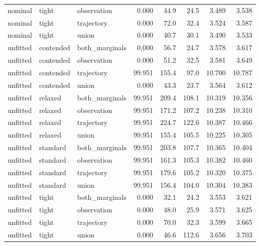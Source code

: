 \begin{longtable}{@{}lllrrrrr@{}}
nominal & tight & observation & 0.000 & 44.9 & 24.5 & 3.489 & 3.538\\
nominal & tight & trajectory & 0.000 & 72.0 & 32.4 & 3.524 & 3.587\\
nominal & tight & union & 0.000 & 40.7 & 30.1 & 3.490 & 3.533\\
unfitted & contended & both\_marginals & 0.000 & 56.7 & 24.7 & 3.578 & 3.617\\
unfitted & contended & observation & 0.000 & 51.2 & 32.5 & 3.581 & 3.649\\
unfitted & contended & trajectory & 99.951 & 155.4 & 97.0 & 10.700 & 10.787\\
unfitted & contended & union & 0.000 & 43.3 & 23.7 & 3.564 & 3.612\\
unfitted & relaxed & both\_marginals & 99.951 & 209.4 & 108.1 & 10.319 & 10.356\\
unfitted & relaxed & observation & 99.951 & 171.2 & 107.2 & 10.238 & 10.310\\
unfitted & relaxed & trajectory & 99.951 & 224.7 & 122.6 & 10.387 & 10.466\\
unfitted & relaxed & union & 99.951 & 155.4 & 105.5 & 10.225 & 10.305\\
unfitted & standard & both\_marginals & 99.951 & 203.8 & 107.7 & 10.365 & 10.404\\
unfitted & standard & observation & 99.951 & 161.3 & 105.3 & 10.382 & 10.460\\
unfitted & standard & trajectory & 99.951 & 179.6 & 105.2 & 10.320 & 10.375\\
unfitted & standard & union & 99.951 & 156.4 & 104.0 & 10.304 & 10.383\\
unfitted & tight & both\_marginals & 0.000 & 32.1 & 24.2 & 3.553 & 3.621\\
unfitted & tight & observation & 0.000 & 48.0 & 25.9 & 3.571 & 3.625\\
unfitted & tight & trajectory & 0.000 & 70.0 & 32.3 & 3.599 & 3.665\\
unfitted & tight & union & 0.000 & 46.6 & 112.6 & 3.656 & 3.703\\
\bottomrule\end{longtable}\normalsize
